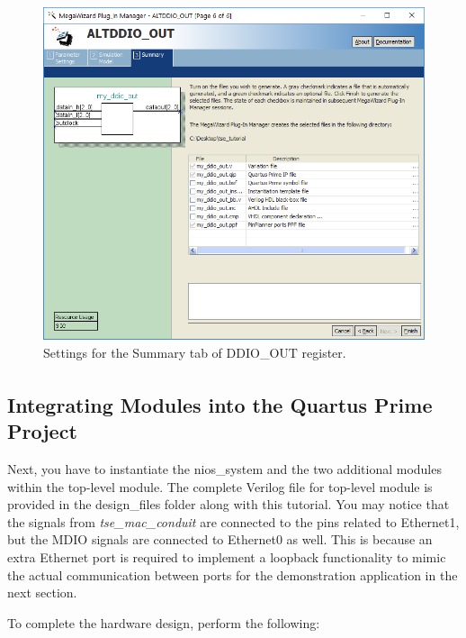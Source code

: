 \documentclass[11pt, twoside, pdftex]{article}
\begin{document}
	\begin{figure}[H]
		\centering
		  \includegraphics[scale=0.6]{figures/ddio_settings2.png}
		\caption{Settings for the Summary tab of DDIO\_OUT register.} 
		\label{fig:ddio_settings2}
	\end{figure}

\subsection{Integrating Modules into the Quartus\textsuperscript{\textregistered} Prime Project}
Next, you have to instantiate the nios\_system and the two additional modules within the top-level module. The complete Verilog file for top-level module is provided in the design\_files folder along with this tutorial. You may notice that the signals from {\it tse\_mac\_conduit} are connected to the pins related to Ethernet1, but the MDIO signals are connected to Ethernet0 as well. This is because an extra Ethernet port is required to implement a loopback functionality to mimic the actual communication between ports for the demonstration application in the next section. 

To complete the hardware design, perform the following:
\end{document}
